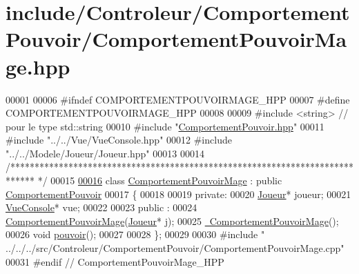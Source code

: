 \hypertarget{_comportement_pouvoir_mage_8hpp_source}{\section{include/\-Controleur/\-Comportement\-Pouvoir/\-Comportement\-Pouvoir\-Mage.hpp}
}

\begin{DoxyCode}
00001 
00006 \textcolor{preprocessor}{#ifndef COMPORTEMENTPOUVOIRMAGE\_HPP}
00007 \textcolor{preprocessor}{}\textcolor{preprocessor}{#define COMPORTEMENTPOUVOIRMAGE\_HPP}
00008 \textcolor{preprocessor}{}
00009 \textcolor{preprocessor}{#include <string>} \textcolor{comment}{// pour le type std::string}
00010 \textcolor{preprocessor}{#include "\hyperlink{_comportement_pouvoir_8hpp}{ComportementPouvoir.hpp}"}
00011 \textcolor{preprocessor}{#include "../../Vue/VueConsole.hpp"}
00012 \textcolor{preprocessor}{#include "../../Modele/Joueur/Joueur.hpp"}
00013 
00014 \textcolor{comment}{/*****************************************************************************
      */}
00015 
\hypertarget{_comportement_pouvoir_mage_8hpp_source_l00016}{}\hyperlink{class_comportement_pouvoir_mage}{00016} \textcolor{keyword}{class }\hyperlink{class_comportement_pouvoir_mage}{ComportementPouvoirMage} : \textcolor{keyword}{public} \hyperlink{class_comportement_pouvoir}{ComportementPouvoir}
00017 \{
00018 
00019    \textcolor{keyword}{private}:
00020     \hyperlink{class_joueur}{Joueur}* joueur;
00021     \hyperlink{class_vue_console}{VueConsole}* vue;
00022 
00023    \textcolor{keyword}{public} :
00024       \hyperlink{class_comportement_pouvoir_mage_a981ec14dbba67cb5d5c709d84fd23d1d}{ComportementPouvoirMage}(\hyperlink{class_joueur}{Joueur}* j);
00025       \hyperlink{class_comportement_pouvoir_mage_a0eb90adc162f3385ad5962b68a9768b8}{~ComportementPouvoirMage}();
00026       \textcolor{keywordtype}{void} \hyperlink{class_comportement_pouvoir_mage_a8a85b640972603a96f87222306e57e7d}{pouvoir}();
00027     
00028 \};
00029 
00030 \textcolor{preprocessor}{#include "
      ../../../src/Controleur/ComportementPouvoir/ComportementPouvoirMage.cpp"}
00031 \textcolor{preprocessor}{#endif // ComportementPouvoirMage\_HPP}
\end{DoxyCode}
